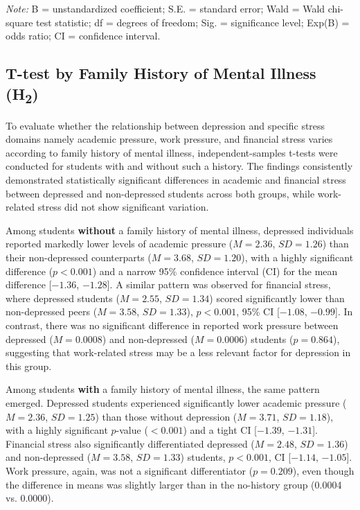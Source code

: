 \documentclass[conference]{IEEEtran}
\begin{document}
\vspace{1mm}
\noindent\textit{Note:} B = unstandardized coefficient; S.E. = standard error; Wald = Wald chi-square test statistic; df = degrees of freedom; Sig. = significance level; Exp(B) = odds ratio; CI = confidence interval.


\subsection{T-test by Family History of Mental Illness (H\textsubscript{2})}

To evaluate whether the relationship between depression and specific stress domains namely academic pressure, work pressure, and financial stress varies according to family history of mental illness, independent-samples t-tests were conducted for students with and without such a history. The findings consistently demonstrated statistically significant differences in academic and financial stress between depressed and non-depressed students across both groups, while work-related stress did not show significant variation.

Among students \textbf{without} a family history of mental illness, depressed individuals reported markedly lower levels of academic pressure ($M = 2.36$, $SD = 1.26$) than their non-depressed counterparts ($M = 3.68$, $SD = 1.20$), with a highly significant difference ($p < 0.001$) and a narrow 95\% confidence interval (CI) for the mean difference [$-1.36$, $-1.28$]. A similar pattern was observed for financial stress, where depressed students ($M = 2.55$, $SD = 1.34$) scored significantly lower than non-depressed peers ($M = 3.58$, $SD = 1.33$), $p < 0.001$, 95\% CI [$-1.08$, $-0.99$]. In contrast, there was no significant difference in reported work pressure between depressed ($M = 0.0008$) and non-depressed ($M = 0.0006$) students ($p = 0.864$), suggesting that work-related stress may be a less relevant factor for depression in this group.

Among students \textbf{with} a family history of mental illness, the same pattern emerged. Depressed students experienced significantly lower academic pressure ($M = 2.36$, $SD = 1.25$) than those without depression ($M = 3.71$, $SD = 1.18$), with a highly significant $p$-value ($< 0.001$) and a tight CI [$-1.39$, $-1.31$]. Financial stress also significantly differentiated depressed ($M = 2.48$, $SD = 1.36$) and non-depressed ($M = 3.58$, $SD = 1.33$) students, $p < 0.001$, CI [$-1.14$, $-1.05$]. Work pressure, again, was not a significant differentiator ($p = 0.209$), even though the difference in means was slightly larger than in the no-history group (0.0004 vs. 0.0000).
\end{document}
